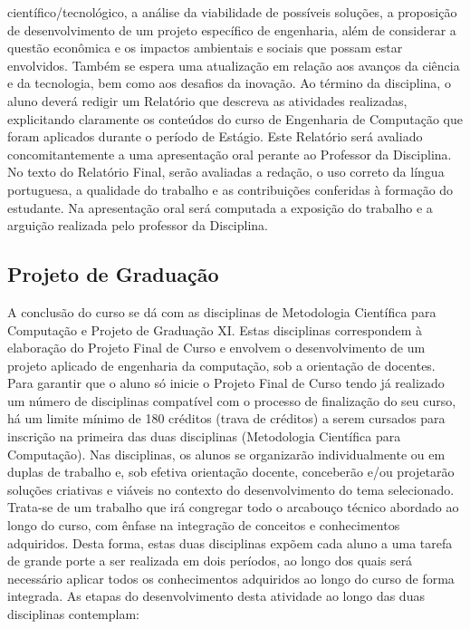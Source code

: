 científico/tecnológico, a análise da viabilidade de possíveis soluções, a proposição de desenvolvimento de um projeto específico de engenharia, além de considerar a questão econômica e os impactos ambientais e sociais que possam estar envolvidos. Também se espera uma atualização em relação aos avanços da ciência e da tecnologia, bem como aos desafios da inovação. Ao término da disciplina, o aluno deverá redigir um Relatório que descreva as atividades realizadas, explicitando claramente os conteúdos do curso de Engenharia de Computação que foram aplicados durante o período de Estágio. Este Relatório será avaliado concomitantemente a uma apresentação oral perante ao Professor da Disciplina. No texto do Relatório Final, serão avaliadas a redação, o uso correto da língua portuguesa, a qualidade do trabalho e as contribuições conferidas à formação do estudante. Na apresentação oral será computada a exposição do trabalho e a arguição realizada pelo professor da Disciplina.

\subsection{Projeto de Graduação}

A conclusão do curso se dá com as disciplinas de Metodologia Científica para Computação e Projeto de Graduação XI.
Estas disciplinas correspondem à elaboração do Projeto Final de Curso e envolvem o desenvolvimento de um projeto aplicado de engenharia da computação, sob a orientação de docentes. Para garantir que o aluno só inicie o Projeto Final de Curso tendo já realizado um número de disciplinas compatível com o processo de finalização do seu curso, há um limite mínimo de 180 créditos (trava de créditos) a serem cursados para inscrição na primeira das duas disciplinas (Metodologia Científica para Computação).
Nas disciplinas, os alunos se organizarão individualmente ou em duplas de trabalho e, sob efetiva orientação docente, conceberão e/ou projetarão soluções criativas e viáveis no contexto do desenvolvimento do tema selecionado.
Trata-se de um trabalho que irá congregar todo o arcabouço técnico abordado ao longo do curso, com ênfase na integração de conceitos e conhecimentos adquiridos. Desta forma, estas duas disciplinas expõem cada aluno a uma tarefa de grande porte a ser realizada em dois períodos, ao longo dos quais será necessário aplicar todos os conhecimentos adquiridos ao longo do curso de forma integrada.
As etapas do desenvolvimento desta atividade ao longo das duas disciplinas contemplam:

